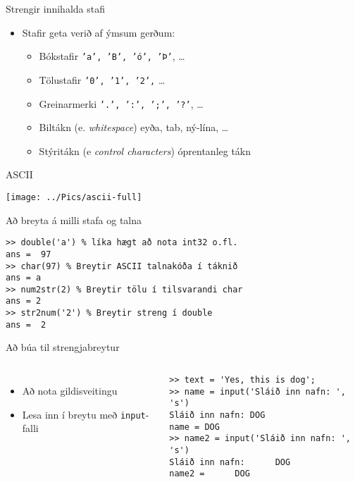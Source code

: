 \documentclass{beamer}
\begin{document}
\begin{frame}{Strengir innihalda stafi}
\begin{itemize}
 \item Stafir geta verið af ýmsum gerðum:
 \begin{itemize}
  \item Bókstafir \texttt{'a', 'B', 'ó', 'Þ'}, \ldots
  \item Tölustafir \texttt{'0', '1', '2',} \ldots
  \item Greinarmerki \texttt{'.', ':', ';', '?'}, \ldots
  \item Biltákn (e. \emph{whitespace})	eyða, tab, ný-lína, \ldots
  \item Stýritákn (e \emph{control characters})	óprentanleg tákn 
 \end{itemize}
\end{itemize}
\end{frame}

\begin{frame}{ASCII}
\begin{center}
\texttt{[image: ../Pics/ascii-full]}
\end{center}
\end{frame}

\begin{frame}[fragile]{Að breyta á milli stafa og talna}
\begin{verbatim}
>> double('a') % líka hægt að nota int32 o.fl.
ans =  97
>> char(97) % Breytir ASCII talnakóða í táknið
ans = a
>> num2str(2) % Breytir tölu í tilsvarandi char
ans = 2
>> str2num('2') % Breytir streng í double
ans =  2
\end{verbatim}
\end{frame}

\begin{frame}[fragile]{Að búa til strengjabreytur}
\begin{columns}
\begin{itemize}
 \item Að nota gildisveitingu
 \item Lesa inn í breytu með \texttt{input}-falli
\end{itemize}\pause
{}
\begin{verbatim}
>> text = 'Yes, this is dog';
>> name = input('Sláið inn nafn: ', 's')
Sláið inn nafn: DOG
name = DOG
>> name2 = input('Sláið inn nafn: ', 's')
Sláið inn nafn:      DOG
name2 =      DOG
\end{verbatim}
\end{columns}
\end{frame}
\end{document}
